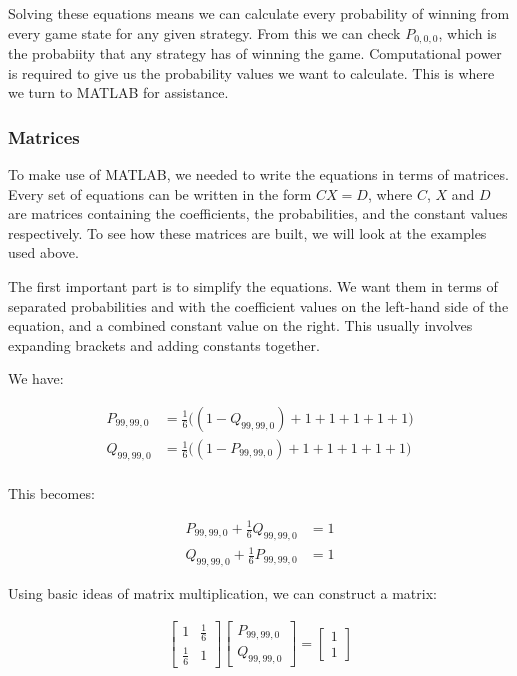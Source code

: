 \documentclass[a4paper,titlepage]{article}
\begin{document}
Solving these equations means we can calculate every probability of winning from every game state for any given strategy. From this we can check $P_{0,0,0}$, which is the probabiity that any strategy has of winning the game. Computational power is required to give us the probability values we want to calculate. This is where we turn to MATLAB for assistance.

\subsubsection{Matrices}
To make use of MATLAB, we needed to write the equations in terms of matrices. Every set of equations can be written in the form $CX=D$, where $C$, $X$ and $D$ are matrices containing the coefficients, the probabilities, and the constant values respectively. To see how these matrices are built, we will look at the examples used above.

The first important part is to simplify the equations. We want them in terms of separated probabilities and with the coefficient values on the left-hand side of the equation, and a combined constant value on the right. This usually involves expanding brackets and adding constants together.

 We have:

\begin{align*}
	P_{99,99,0} &= \frac{1}{6}\bigg((1 - Q_{99,99,0}) + 1 + 1 + 1 + 1 + 1\bigg)\\
	Q_{99,99,0} &= \frac{1}{6}\bigg((1 - P_{99,99,0}) + 1 + 1 + 1 + 1 + 1\bigg)\\
\end{align*}

This becomes:

\begin{align*}
	P_{99,99,0} + \frac{1}{6}Q_{99,99,0} &= 1\\
	Q_{99,99,0} + \frac{1}{6}P_{99,99,0} &= 1
\end{align*}

Using basic ideas of matrix multiplication, we can construct a matrix:

\begin{align*}
	\begin{bmatrix}
	    1          & \frac{1}{6}\\
	    \frac{1}{6} & 1
	\end{bmatrix}
	\begin{bmatrix}
		P_{99,99,0}\\
		Q_{99,99,0}
	\end{bmatrix}
	=
	\begin{bmatrix}
		1\\
		1
	\end{bmatrix}
\end{align*}
\end{document}
